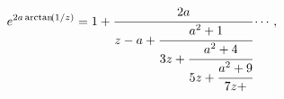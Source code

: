 \[e^{2a\mathop{\mathrm{arctan}\/}\nolimits\!\left(1/z\right)}={1+\cfrac{2a}{z-a+%
\cfrac{a^{2}+1}{3z+\cfrac{a^{2}+4}{5z+\cfrac{a^{2}+9}{7z+}}}}\cdots,}\]